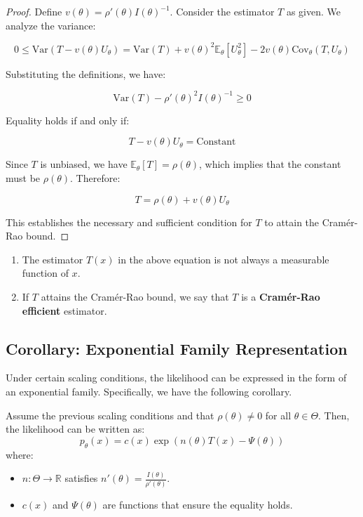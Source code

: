 \documentclass[open=any, 11pt,paper=A4]{scrreprt}
\begin{document}
\begin{proof}
    Define \(v(\theta) = \rho'(\theta) I(\theta)^{-1}\). Consider the estimator \(T\) as given. We analyze the variance:

    \[
    0 \leq \text{Var}(T - v(\theta) U_\theta) = \text{Var}(T) + v(\theta)^2 \mathbb{E}_\theta[U_\theta^2] - 2 v(\theta) \text{Cov}_\theta(T, U_\theta)
    \]

    Substituting the definitions, we have:

    \[
    \text{Var}(T) - \rho'(\theta)^2 I(\theta)^{-1} \geq 0
    \]

    Equality holds if and only if:

    \[
    T - v(\theta) U_\theta = \text{Constant}
    \]

    Since \(T\) is unbiased, we have \(\mathbb{E}_\theta[T] = \rho(\theta)\), which implies that the constant must be \(\rho(\theta)\). Therefore:

    \[
    T = \rho(\theta) + v(\theta) U_\theta
    \]

    This establishes the necessary and sufficient condition for \(T\) to attain the Cramér-Rao bound.
\end{proof}

\begin{remark}
    \begin{enumerate}
        \item The estimator \(T(x)\) in the above equation is not always a measurable function of \(x\).
        \item If \(T\) attains the Cramér-Rao bound, we say that \(T\) is a \textbf{Cramér-Rao efficient} estimator.
    \end{enumerate}
\end{remark}

\subsection*{Corollary: Exponential Family Representation}

Under certain scaling conditions, the likelihood can be expressed in the form of an exponential family. Specifically, we have the following corollary.

\begin{corollary}
    Assume the previous scaling conditions and that \(\rho(\theta) \neq 0\) for all \(\theta \in \Theta\). Then, the likelihood can be written as:
    \[
    p_\theta(x) = c(x) \exp\left( n(\theta) T(x) - \Psi(\theta) \right)
    \]
    where:
    \begin{itemize}
        \item \(n: \Theta \to \mathbb{R}\) satisfies \(n'(\theta) = \frac{I(\theta)}{\rho'(\theta)}\).
        \item \(c(x)\) and \(\Psi(\theta)\) are functions that ensure the equality holds.
    \end{itemize}
\end{corollary}
\end{document}
